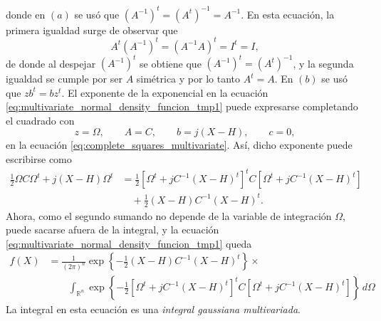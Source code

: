\documentclass[a4paper]{report}
\begin{document}
donde en \((a)\) se usó que \((A^{-1})^t=(A^t)^{-1}=A^{-1}\). En esta ecuación, la primera igualdad surge de observar que
\[
 A^t(A^{-1})^t=(A^{-1}A)^t=I^t=I,
\]
de donde al despejar \((A^{-1})^t\) se obtiene que \((A^{-1})^t=(A^t)^{-1}\), y la segunda igualdad se cumple por ser \(A\) simétrica y por lo tanto \(A^t=A\). En \((b)\) se usó que \(zb^t=bz^t\). El exponente de la exponencial en la ecuación \ref{eq:multivariate_normal_density_funcion_tmp1} puede expresarse completando el cuadrado con
\[
 z=\Omega,\qquad A=C,\qquad b=j(X-H),\qquad c=0,
\]
en la ecuación \ref{eq:complete_squares_multivariate}. Así, dicho exponente puede escribirse como
\begin{align*}
 \frac{1}{2}\Omega C\Omega^t+j(X-H)\Omega^t&=\frac{1}{2}\left[\Omega^t+jC^{-1}(X-H)^t\right]^tC\left[\Omega^t+jC^{-1}(X-H)^t\right]\\
   &\quad+\frac{1}{2}\left(X-H\right)C^{-1}\left(X-H\right)^t.
\end{align*}
Ahora, como el segundo sumando no depende de la variable de integración \(\Omega\), puede sacarse afuera de la integral, y la ecuación \ref{eq:multivariate_normal_density_funcion_tmp1} queda
\begin{align}\label{eq:multivariate_normal_density_funcion_tmp2}
 f(X)&=\frac{1}{(2\pi)^n}\exp\left\{-\frac{1}{2}\left(X-H\right)C^{-1}\left(X-H\right)^t\right\}\times \nonumber\\
  &\qquad \int_{{\mathbb{R}^n}}\exp\left\{-\frac{1}{2}\left[\Omega^t+jC^{-1}(X-H)^t\right]^tC\left[\Omega^t+jC^{-1}(X-H)^t\right]\right\}\,d\Omega
\end{align}
La integral en esta ecuación es una \emph{integral gaussiana multivariada}. 
\end{document}
